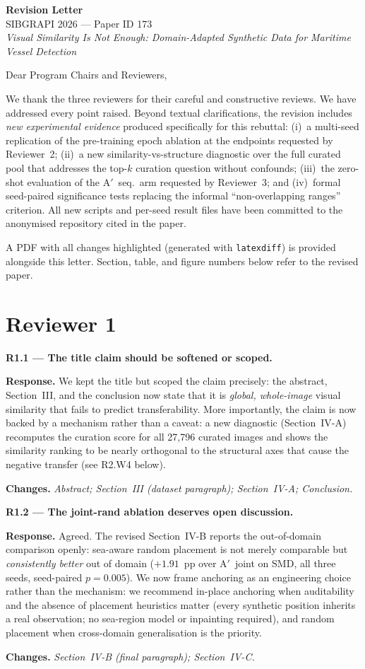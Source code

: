 \documentclass[11pt]{article}
\newcommand{\resp}[1]{\par\noindent\textbf{Response.} #1}
\newcommand{\chg}[1]{\par\noindent\textbf{Changes.} \textit{#1}}
\newcommand{\pt}[1]{\par\medskip\noindent\textbf{#1}}
\begin{document}
\begin{center}
{\Large\bfseries Revision Letter}\\[4pt]
SIBGRAPI 2026 --- Paper ID 173\\
\textit{Visual Similarity Is Not Enough: Domain-Adapted Synthetic Data for
Maritime Vessel Detection}
\end{center}

\bigskip
Dear Program Chairs and Reviewers,

We thank the three reviewers for their careful and constructive reviews. We
have addressed every point raised. Beyond textual clarifications, the revision
includes \emph{new experimental evidence} produced specifically for this
rebuttal: (i)~a multi-seed replication of the pre-training epoch ablation at
the endpoints requested by Reviewer~2; (ii)~a new similarity-vs-structure
diagnostic over the full curated pool that addresses the top-$k$ curation
question without confounds; (iii)~the zero-shot evaluation of the A$'$~seq.\
arm requested by Reviewer~3; and (iv)~formal seed-paired significance tests
replacing the informal ``non-overlapping ranges'' criterion. All new scripts
and per-seed result files have been committed to the anonymised repository
cited in the paper.

A PDF with all changes highlighted (generated with \texttt{latexdiff}) is
provided alongside this letter. Section, table, and figure numbers below refer
to the revised paper.

\section*{Reviewer 1}

\pt{R1.1 --- The title claim should be softened or scoped.}
\resp{We kept the title but scoped the claim precisely: the abstract,
Section~III, and the conclusion now state that it is \emph{global, whole-image}
visual similarity that fails to predict transferability. More importantly, the
claim is now backed by a mechanism rather than a caveat: a new diagnostic
(Section~IV-A) recomputes the curation score for all 27{,}796 curated images
and shows the similarity ranking to be nearly orthogonal to the structural
axes that cause the negative transfer (see R2.W4 below).}
\chg{Abstract; Section~III (dataset paragraph); Section~IV-A; Conclusion.}

\pt{R1.2 --- The joint-rand ablation deserves open discussion.}
\resp{Agreed. The revised Section~IV-B reports the out-of-domain comparison
openly: sea-aware random placement is not merely comparable but
\emph{consistently better} out of domain ($+1.91$~pp over A$'$~joint on SMD,
all three seeds, seed-paired $p=0.005$). We now frame anchoring as an
engineering choice rather than the mechanism: we recommend in-place anchoring
when auditability and the absence of placement heuristics matter (every
synthetic position inherits a real observation; no sea-region model or
inpainting required), and random placement when cross-domain generalisation is
the priority.}
\chg{Section~IV-B (final paragraph); Section~IV-C.}
\end{document}
